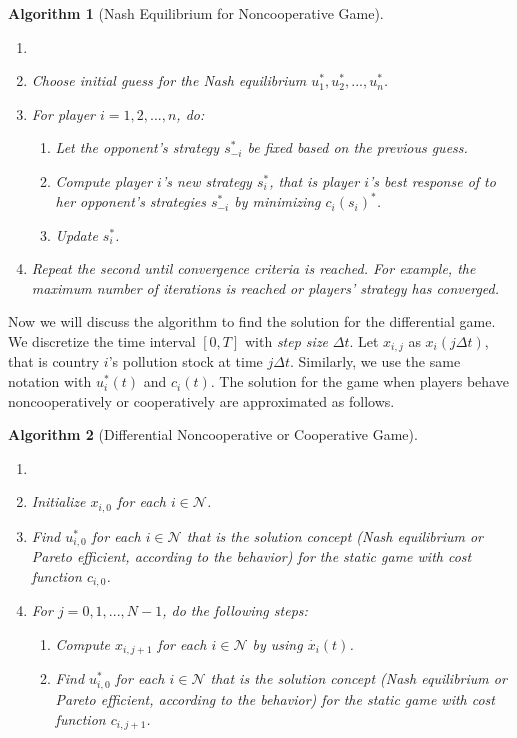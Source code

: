 \documentclass[a4paper,fleqn]{cas-dc}
\newtheorem{algorithm}{Algorithm}
\begin{document}
\begin{algorithm}[Nash Equilibrium for Noncooperative Game]
\begin{enumerate} \label{algorithm:static}
    \item[]
    \item Choose initial guess for the Nash equilibrium $u_1^*, u_2^*, ..., u_n^*$.
    \item For player $i=1,2,...,n$, do:
    \begin{enumerate}
        \item Let the opponent's strategy $s_{-i}^*$ be fixed based on the previous guess.
        \item Compute player $i$'s new strategy $s_i^*$, that is player $i$'s best response of to her opponent's strategies $s_{-i}^*$ by minimizing $c_i(s_i)^*$.
        \item Update $s_i^*$.
    \end{enumerate}
    \item Repeat the second until convergence criteria is reached. For example, the maximum number of iterations is reached or players' strategy has converged.
\end{enumerate}
\end{algorithm}

Now we will discuss the algorithm to find the solution for the differential game. We discretize the time interval $[0,T]$ with \emph{step size} $\Delta{t}$. Let $x_{i,j}$ as $x_i(j\Delta{t})$, that is country $i$'s pollution stock at time $j\Delta{t}$. Similarly, we use the same notation with $u_i^*(t)$ and $c_i(t)$. The solution for the game when players behave noncooperatively or cooperatively are approximated as follows.

\begin{algorithm}[Differential Noncooperative or Cooperative Game] \label{algorithm:noncoop coop}
\begin{enumerate}
 \item[]
 \item Initialize $x_{i,0}$ for each $i\in\mathcal{N}$.
 \item Find $u_{i,0}^*$ for each $i\in\mathcal{N}$ that is the solution concept (Nash equilibrium or Pareto efficient, according to the behavior) for the static game with cost function $c_{i,0}$.
 \item For $j=0,1,...,N-1$, do the following steps:
    \begin{enumerate}
        \item Compute $x_{i,j+1}$ for each $i\in\mathcal{N}$ by using $\dot{x_i}(t)$.
        \item Find $u_{i,0}^*$ for each $i\in\mathcal{N}$ that is the solution concept (Nash equilibrium or Pareto efficient, according to the behavior) for the static game with cost function $c_{i,j+1}$.
    \end{enumerate}
\end{enumerate}
\end{algorithm}
\end{document}
